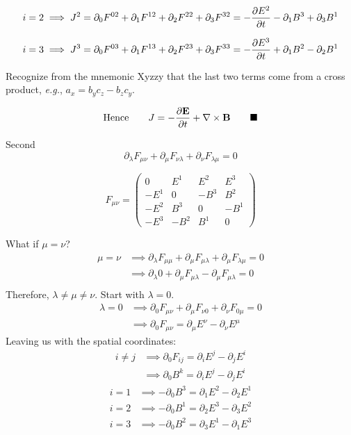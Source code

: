 \documentclass{article}
\begin{document}
 \[ i=2\implies J^2=\partial_0 F^{0 2}+\partial_1 F^{1 2}+\partial_2 F^{2 2}+\partial_3 F^{3 2}=-\pdv{E^2}{t}-\partial_1 B^3+\partial_3 B^1
 \]

 \[ i=3\implies J^3=\partial_0 F^{0 3}+\partial_1 F^{1 3}+\partial_2 F^{2 3}+\partial_3 F^{3 3}=-\pdv{E^3}{t}+\partial_1 B^2-\partial_2 B^1
 \]

 Recognize from the mnemonic Xyzzy that the last two terms come from a cross product, \emph{e.g.}, $a_x=b_y c_z-b_z c_y$.

 \[\text{Hence}\qquad
J=-\frac{\partial \vb{E}}{\partial t}+ \vb{\nabla} \times \vb{B} 
 \qquad\blacksquare\]


	Second \[ \partial_\lambda F_{\mu \nu} + \partial_\mu F_{\nu \lambda} + \partial_\nu F_{\lambda \mu} = 0 \]

\[F_{\mu\nu}=\begin{pmatrix}
  0 & E^1 & E^2 & E^3 \\
  -E^1 & 0 & -B^3 & B^2 \\
  -E^2 & B^3 & 0 & -B^1  \\
  -E^3 & -B^2 & B^1 & 0
 \end{pmatrix}
\]	

What if $\mu=\nu$?
\begin{align*} 
\mu=\nu&\implies\partial_\lambda F_{\mu \mu} + \partial_\mu F_{\mu \lambda} + \partial_\mu F_{\lambda \mu} = 0 \\
&\implies\partial_\lambda 0 + \partial_\mu F_{\mu \lambda} - \partial_\mu F_{\mu\lambda } = 0 \\
\end{align*}
Therefore, $\lambda\ne\mu\ne\nu$.
Start with $\lambda=0$.
\begin{align*} 
\lambda=0&\implies\partial_0 F_{\mu \nu} + \partial_\mu F_{\nu 0} + \partial_\nu F_{0 \mu} = 0 \\
&\implies\partial_0 F_{\mu \nu} = \partial_\mu E^{\nu} - \partial_\nu E^{\mu} 
\end{align*}
Leaving us with the spatial coordinates:
\begin{align*} 
i\ne j&\implies\partial_0 F_{i j} =\partial_i E^{j} - \partial_j E^{i}  \\
&\implies\partial_0 B^{k} = \partial_i E^{j} - \partial_j E^{i} 
\end{align*}
\begin{align*} 
i=1&\implies -\partial_0 B^{3} = \partial_1 E^{2} - \partial_2 E^{1} \\
i=2&\implies -\partial_0 B^{1} = \partial_2 E^{3} - \partial_3 E^{2} \\
i=3&\implies -\partial_0 B^{2} = \partial_3 E^{1} - \partial_1 E^{3} \\
\end{align*}
\end{document}
